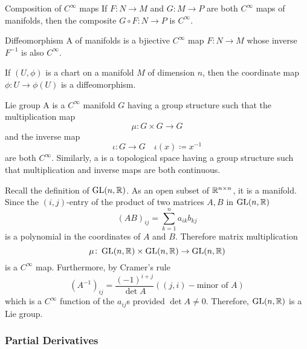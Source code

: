 
\begin{proposition}{Composition of \(C^\infty\) maps}{}
    If \(F \colon N \rightarrow M\) and \(G \colon M \rightarrow P\) are both \(C^\infty\) maps of manifolds, then the composite \(G \circ F \colon N \rightarrow P\) is \(C^\infty\).
\end{proposition}

\begin{definition}{Diffeomorphism}{}
    A  of manifolds is a bjiective \(C^\infty\) map \(F \colon N \rightarrow M\) whose inverse \(F^{-1}\) is also \(C^\infty\).
\end{definition}

\begin{proposition}{}{}
    If \((U, \phi)\) is a chart on a manifold \(M\) of dimension \(n\), then the coordinate map \(\phi \colon U \rightarrow \phi(U)\) is a diffeomorphism.
\end{proposition}

\begin{definition}{Lie group}{}
    A  is a \(C^\infty\) manifold \(G\) having a group structure such that the multiplication map
    \[
        \mu \colon G \times G \rightarrow G
    \]
    and the inverse map
    \[
        \iota \colon G \rightarrow G \quad \iota(x) \coloneqq x^{-1}
    \]
    are both \(C^\infty\).
    Similarly, a  is a topological space having a group structure such that multiplication and inverse maps are both continuous.
\end{definition}

\begin{example}
    Recall the definition of \(\operatorname{GL}(n, \mathbb{R})\).
    As an open subset of \(\mathbb{R}^{n \times n}\), it is a manifold.
    Since the \((i,j)\)-entry of the product of two matrices \(A, B\) in \(\operatorname{GL}(n, \mathbb{R})\)
    \[
        (AB)_{ij} = \sum_{k=1}^n a_{ik}b_{kj}
    \]
    is a polynomial in the coordinates of \(A\) and \(B\).
    Therefore matrix multiplication
    \[
        \mu \colon \operatorname{GL}(n, \mathbb{R}) \times \operatorname{GL}(n, \mathbb{R}) \rightarrow \operatorname{GL}(n, \mathbb{R})
    \]
    is a \(C^\infty\) map.
    Furthermore, by Cramer's rule
    \[
        (A^{-1})_{ij} = \frac{(-1)^{i+j}}{\det A} ((j,i)-\text{minor of }A)
    \]
    which is a \(C^\infty\) function of the \(a_{ij}\)s provided \(\det A \neq 0\).
    Therefore, \(\operatorname{GL}(n, \mathbb{R})\) is a Lie group.
\end{example}

\subsubsection{Partial Derivatives}

